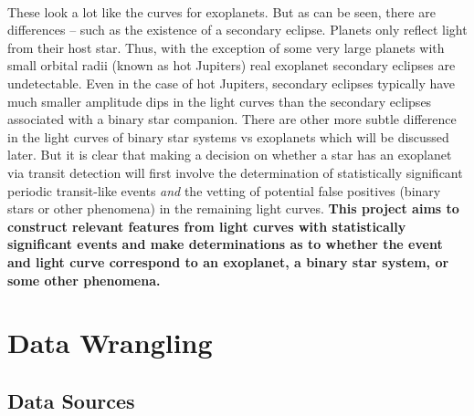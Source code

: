 \documentclass{article}
\begin{document}
\paragraph{} These look a lot like the curves for exoplanets. But as can be seen, there are differences -- such as the existence of a secondary eclipse. Planets only reflect light from their host star. Thus, with the exception of some very large planets with small orbital radii (known as hot Jupiters) real exoplanet secondary eclipses are undetectable. Even in the case of hot Jupiters, secondary eclipses typically have much smaller amplitude dips in the light curves than the secondary eclipses associated with a binary star companion. There are other more subtle difference in the light curves of binary star systems vs exoplanets which will be discussed later. But it is clear that making a decision on whether a star has an exoplanet via transit detection will first involve the determination of statistically significant periodic transit-like events  \textit{and} the vetting of potential false positives (binary stars or other phenomena) in the remaining light curves. \textbf{This project aims to construct relevant features from light curves with statistically significant events and make determinations as to whether the event and light curve correspond to an exoplanet, a binary star system, or some other phenomena.} 
\section{Data Wrangling}
\subsection{Data Sources}
\end{document}
